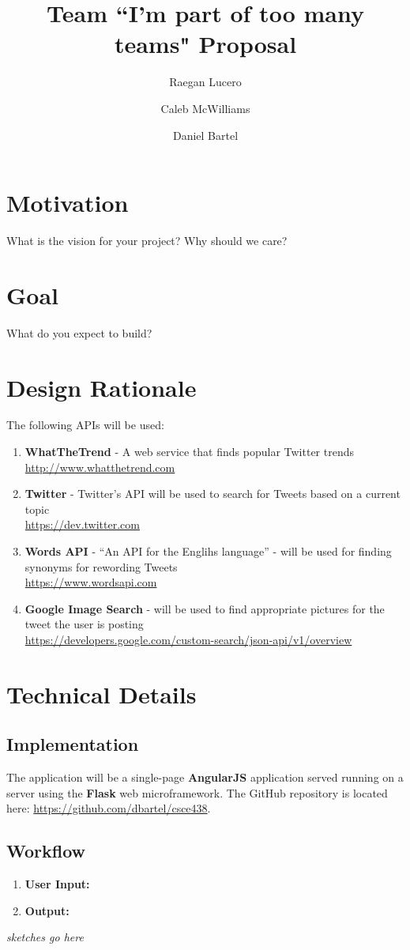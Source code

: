 \documentclass{article}
\title{Team ``I'm part of too many teams" Proposal}
\date{}
\author{
	Raegan Lucero
	\and
	 Caleb McWilliams
	\and
	 Daniel Bartel
 }
\begin{document}
\maketitle

\section*{Motivation}
What is the vision for your project? Why should we care?

\section*{Goal}
What do you expect to build?

\section*{Design Rationale}


The following APIs will be used:
\begin{enumerate}
  \item[\textbullet] \textbf{WhatTheTrend} - A web service that finds popular Twitter trends \\
    \url{http://www.whatthetrend.com}
  \item[\textbullet] \textbf{Twitter} - Twitter's API will be used to search for Tweets based on a current topic \\
    \url{https://dev.twitter.com}
  \item[\textbullet] \textbf{Words API} - ``An API for the Englihs language'' - will be used for finding synonyms for rewording Tweets \\ 
    \url{https://www.wordsapi.com}
  \item[\textbullet] \textbf{Google Image Search} - will be used to find appropriate pictures for the tweet the user is posting \\
    \url{https://developers.google.com/custom-search/json-api/v1/overview}
\end{enumerate}
	
\section*{Technical Details}

\subsection*{Implementation}
The application will be a single-page \textbf{AngularJS} application served running on a server using the \textbf{Flask} web microframework.
The GitHub repository is located here: \url{https://github.com/dbartel/csce438}.



\subsection*{Workflow}
\begin{enumerate}
	\item[\textbullet] \textbf{User Input:}
	\item[\textbullet] \textbf{Output:}
\end{enumerate}
\textit{sketches go here}
\end{document}
